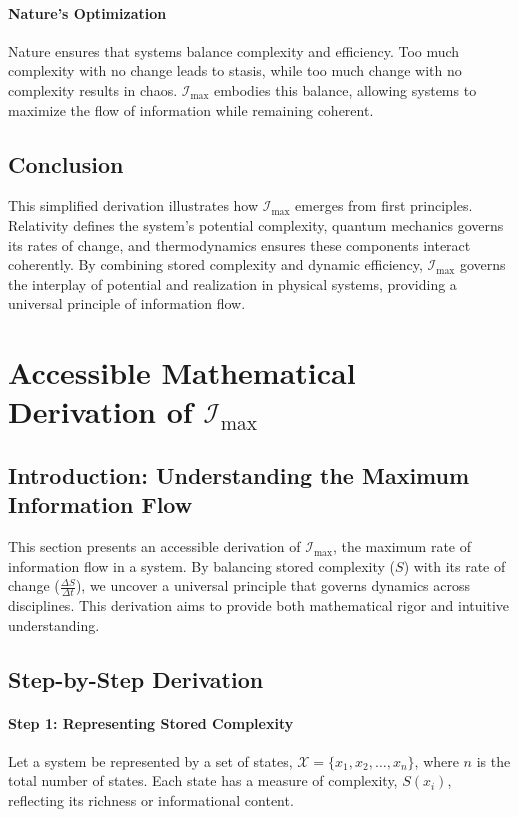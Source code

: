 \documentclass[12pt]{article}
\begin{document}
\paragraph{Nature’s Optimization}
Nature ensures that systems balance complexity and efficiency. Too much complexity with no change leads to stasis, while too much change with no complexity results in chaos. \(\mathcal{I}_{\text{max}}\) embodies this balance, allowing systems to maximize the flow of information while remaining coherent.

\subsection{Conclusion}
This simplified derivation illustrates how \(\mathcal{I}_{\text{max}}\) emerges from first principles. Relativity defines the system’s potential complexity, quantum mechanics governs its rates of change, and thermodynamics ensures these components interact coherently. By combining stored complexity and dynamic efficiency, \(\mathcal{I}_{\text{max}}\) governs the interplay of potential and realization in physical systems, providing a universal principle of information flow.


\section{Accessible Mathematical Derivation of \(\mathcal{I}_{\text{max}}\)}

\subsection{Introduction: Understanding the Maximum Information Flow}
This section presents an accessible derivation of \(\mathcal{I}_{\text{max}}\), the maximum rate of information flow in a system. By balancing stored complexity (\(S\)) with its rate of change (\(\frac{\Delta S}{\Delta t}\)), we uncover a universal principle that governs dynamics across disciplines. This derivation aims to provide both mathematical rigor and intuitive understanding.

\subsection{Step-by-Step Derivation}

\paragraph{Step 1: Representing Stored Complexity}
Let a system be represented by a set of states, \(\mathcal{X} = \{x_1, x_2, \ldots, x_n\}\), where \(n\) is the total number of states. Each state has a measure of complexity, \(S(x_i)\), reflecting its richness or informational content.
\end{document}
